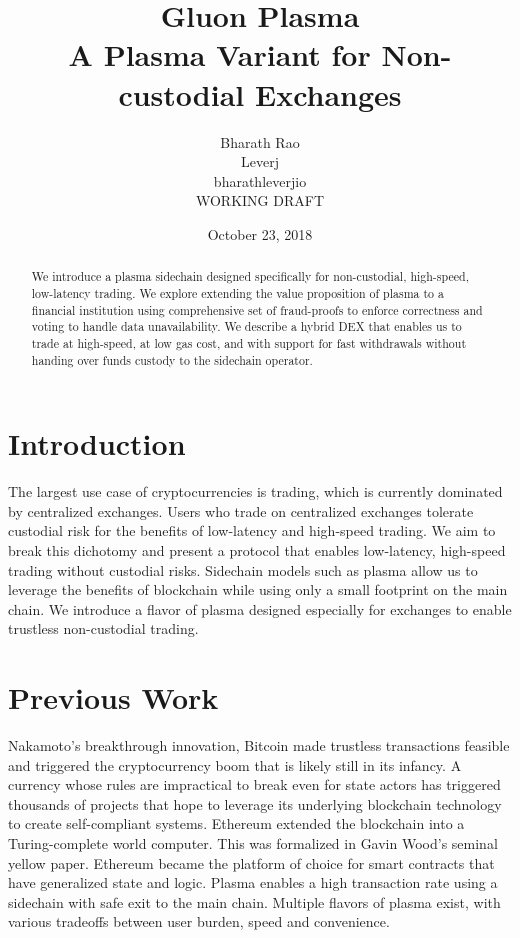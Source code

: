 \documentclass[12pt,a4paper]{article}
\title{Gluon Plasma \\
\large A Plasma Variant for Non-custodial Exchanges}
\author{Bharath Rao \\ 
Leverj\\
bharath\svgat leverj\svgperiod io \\
\tiny WORKING DRAFT}
\date{October 23, 2018}
\begin{document}
\maketitle

\begin{abstract}

        We introduce a plasma sidechain designed specifically for non-custodial, high-speed, low-latency trading. We explore extending the value proposition of plasma to a financial institution using comprehensive set of fraud-proofs to enforce correctness and voting to handle data unavailability. We describe a hybrid DEX that enables us to trade at high-speed, at low gas cost, and with support for fast withdrawals without handing over funds custody to the sidechain operator. 
\end{abstract}

\section{Introduction}

The largest use case of cryptocurrencies is trading, which is currently dominated by centralized exchanges. Users who trade on centralized exchanges tolerate custodial risk for the benefits of low-latency and high-speed trading. We aim to break this dichotomy and present a protocol that enables low-latency, high-speed trading without custodial risks. 
Sidechain models such as plasma allow us to leverage the benefits of blockchain while using only a small footprint on the main chain. We introduce a flavor of plasma designed especially for exchanges to enable trustless non-custodial trading.

\section{Previous Work}

Nakamoto’s breakthrough innovation, Bitcoin\cite{Nak09} made trustless transactions feasible and triggered the cryptocurrency boom that is likely still in its infancy. A currency whose rules are impractical to break even for state actors has triggered thousands of projects that hope to leverage its underlying blockchain technology to create self-compliant systems. 
Ethereum\cite{Eth14} extended the blockchain into a Turing-complete world computer. This was formalized in Gavin Wood’s seminal yellow paper\cite{Gav15}. Ethereum became the platform of choice for smart contracts that have generalized state and logic. Plasma\cite{PB17} enables a high transaction rate using a sidechain with safe exit to the main chain. Multiple flavors of plasma exist, with various tradeoffs between user burden, speed and convenience.
\end{document}
